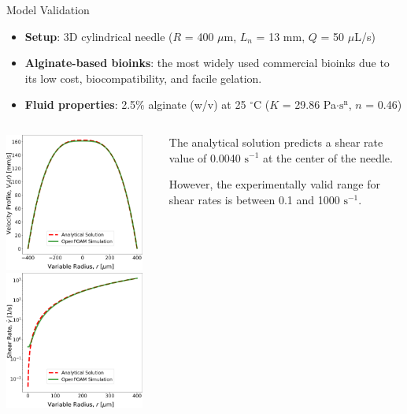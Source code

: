\begin{frame}{Model Validation}

\begin{itemize}
\item \textbf{Setup}: 3D cylindrical needle ($R$ = 400 $\mu$m, $L_n$ = 13 mm, $Q$ = 50 $\mu$L/s)
\item \textbf{Alginate-based bioinks}: the most widely used commercial bioinks due to its low cost, biocompatibility, and facile gelation.\footnotemark
\item \textbf{Fluid properties}: 2.5$\%$ alginate (w/v) at 25 $^{\circ}$C ($K$ = 29.86 Pa$\cdot \text{s}^\text{n}$, $n$ = 0.46)
\end{itemize}

\begin{columns}
\small
{}
\centering
\includegraphics[trim = 0mm 0mm 0mm 0mm, clip, width=1.8in]{./images/velocity_profile.png}
\centering
\includegraphics[trim = 0mm 0mm 0mm 0mm, clip, width=1.8in]{./images/shear_rate.png}

\begin{block}{}
    The analytical solution predicts a shear rate value of 0.0040 $\text{s}^{-1}$ at the center of the needle.
    
    However, the experimentally valid range for shear rates is between 0.1 and 1000 $\text{s}^{-1}$.
\end{block}
\end{columns}

\end{frame}


